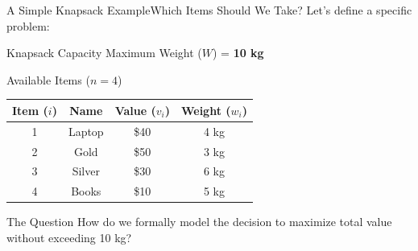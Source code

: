 \documentclass[aspectratio=169]{beamer}
\begin{document}
\begin{frame}{A Simple Knapsack Example}{Which Items Should We Take?}
    \footnotesize
    Let's define a specific problem:

    \begin{block}{Knapsack Capacity}
        \centering
        Maximum Weight ($W$) = \textbf{10 kg}
    \end{block}

    \begin{block}{Available Items ($n=4$)}
        \centering
        \begin{tabular}{cccc}
        \toprule
        \textbf{Item ($i$)} & \textbf{Name} & \textbf{Value ($v_i$)} & \textbf{Weight ($w_i$)} \\
        \midrule
        1 & Laptop & \$40 & 4 kg \\
        2 & Gold & \$50 & 3 kg \\
        3 & Silver & \$30 & 6 kg \\
        4 & Books & \$10 & 5 kg \\
        \bottomrule
        \end{tabular}
    \end{block}

    \begin{alertblock}{The Question}
        \centering
        How do we formally model the decision to maximize total value without exceeding 10 kg?
    \end{alertblock}
\end{frame}
\end{document}
